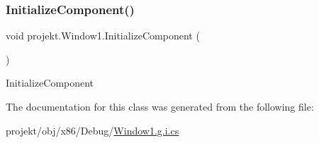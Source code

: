 \subsubsection{\texorpdfstring{Initialize\+Component()}{InitializeComponent()}}
{\footnotesize\ttfamily void projekt.\+Window1.\+Initialize\+Component (\begin{DoxyParamCaption}{ }\end{DoxyParamCaption})\hspace{0.3cm}{\ttfamily [inline]}}



Initialize\+Component 



The documentation for this class was generated from the following file\+:\begin{DoxyCompactItemize}
\item 
projekt/obj/x86/\+Debug/\mbox{\hyperlink{_window1_8g_8i_8cs}{Window1.\+g.\+i.\+cs}}\end{DoxyCompactItemize}
